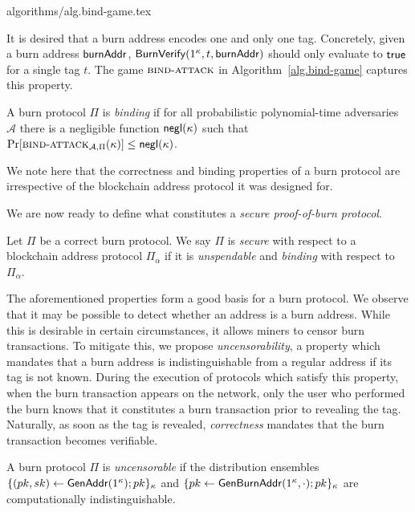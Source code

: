 {algorithms/alg.bind-game.tex}

It is desired that a burn address encodes one and only one tag. Concretely, given a burn address $\mathsf{burnAddr}$, $\mathsf{BurnVerify}(1^\kappa, t, \mathsf{burnAddr})$ should only evaluate to $\mathsf{true}$ for a single tag $t$. The game $\textsc{bind}\-\text{-}\-\textsc{attack}$ in Algorithm~\ref{alg.bind-game} captures this property.

\begin{definition}[Binding]
  A burn protocol $\Pi$ is \emph{binding} if
  for all probabilistic polynomial-time adversaries $\mathcal{A}$ there is a
  negligible function $\textsf{negl}(\kappa)$ such that
  $\Pr[\textsc{bind}\-\text{-}\-\textsc{attack}_{\mathcal{A},\Pi}(\kappa)] \leq \textsf{negl}(\kappa)$.
\end{definition}

We note here that the correctness and binding properties of a burn protocol are irrespective of the blockchain address protocol it was designed for.

We are now ready to define what constitutes a \emph{secure proof-of-burn protocol}.

\begin{definition}[Security]
  Let $\Pi$ be a correct burn protocol. We say $\Pi$ is \emph{secure} with respect to a blockchain address protocol $\Pi_\alpha$ if it is \emph{unspendable} and \emph{binding} with respect to $\Pi_\alpha$.
\end{definition}

The aforementioned properties form a good basis for a burn protocol. We observe that it may be possible to detect whether an address is a burn address. While this is desirable in certain circumstances, it allows miners to censor burn transactions. To mitigate this, we propose \emph{uncensorability}, a property which mandates that a burn address is indistinguishable from a regular address if its tag is not known. During the execution of protocols which satisfy this property, when the burn transaction appears on the network, only the user who performed the burn knows that it constitutes a burn transaction prior to revealing the tag. Naturally, as soon as the tag is revealed, \emph{correctness} mandates that the burn transaction becomes verifiable.

\begin{definition}[Uncensorability]
  A burn protocol $\Pi$ is \emph{uncensorable} if
  the distribution ensembles $\{(pk, sk) \gets \mathsf{GenAddr}(1^\kappa); pk\}_\kappa$ and
  $\{pk \gets \mathsf{Gen}\-\mathsf{Burn}\-\mathsf{Addr}(1^\kappa, \cdot); pk\}_\kappa$ are computationally indistinguishable.
\end{definition}
